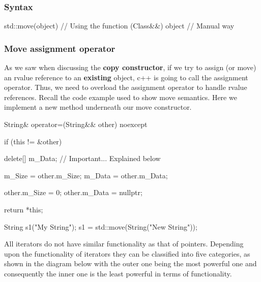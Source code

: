 \documentclass{report}
\begin{document}
    \subsubsection{Syntax}
    \bigbreak \noindent 
    \begin{cppcode}
    std::move(object) // Using the function
    (Class&&) object // Manual way
    \end{cppcode}

    \bigbreak \noindent 
    \subsubsection{Move assignment operator}
    \bigbreak \noindent 
    As we saw when discussing the \textbf{copy constructor}, if we try to assign (or move) an rvalue reference to an \textbf{existing} object, c++ is going to call the assignment operator. Thus, we need to overload the assignment operator to handle rvalue references. Recall the code example used to show move semantics. Here we implement a new method underneath our move constructor.
    \bigbreak \noindent 
    \begin{cppcode}
        String& operator=(String&& other) noexcept {
            if (this != &other) {
                delete[] m_Data; // Important... Explained below
                
                m_Size = other.m_Size;
                m_Data = other.m_Data;

                other.m_Size = 0;
                other.m_Data = nullptr;

                return *this;
            }
        }
        String s1("My String");
        s1 = std::move(String("New String"));
    \end{cppcode}
    \bigbreak \noindent 

    \pagebreak
    \bigbreak \noindent 
        \begin{concept}
        All iterators do not have similar functionality as that of pointers. Depending upon the functionality of iterators they can be classified into five categories, as shown in the diagram below with the outer one being the most powerful one and consequently the inner one is the least powerful in terms of functionality.
    \end{concept}
    \begin{figure}[ht]
        \centering
        \label{fig:iterator}
    \end{figure}
    \bigbreak \noindent 
\end{document}
